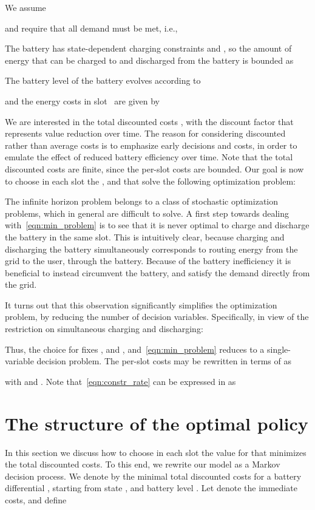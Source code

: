 \documentclass[journal]{IEEEtran}
\newcommand\1{\mathbf{1}}
\begin{document}
We assume

and require that all demand must be met, i.e.,

The battery has state-dependent charging constraints  and , so the amount of energy that can be charged to and discharged from the battery is bounded as



The battery level of the battery evolves according to

and the energy costs in slot~ are given by

We are interested in the total discounted costs , with  the discount factor that represents value reduction over time. The reason for considering discounted rather than average costs is to emphasize early decisions and costs, in order to emulate the effect of reduced battery efficiency over time. Note that the total discounted costs are finite, since the per-slot costs are bounded. Our goal is now to choose in each slot the ,  and  that solve the following optimization problem:


The infinite horizon problem belongs to a class of stochastic optimization problems, which
in general are difficult to solve. A first step towards dealing with~\eqref{eqn:min_problem} is to see that it is never optimal to charge and discharge the battery in the same slot.
This is intuitively clear, because charging and discharging the battery simultaneously corresponds to routing  energy from the grid to the user, through the battery. Because of the battery inefficiency it is beneficial to instead circumvent the battery, and satisfy the demand directly from the grid.

It turns out that this observation significantly simplifies the optimization problem, by reducing the number of decision variables.
Specifically, in view of the restriction on simultaneous charging and discharging:

Thus, the choice for  fixes ,  and , and~\eqref{eqn:min_problem} reduces to a single-variable decision problem. The per-slot costs may be rewritten in terms of  as

with  and . Note that~\eqref{eqn:constr_rate} can be expressed in  as




\section{The structure of the optimal policy}\label{sec:structure}
In this section we discuss how to choose in each slot the value for  that minimizes the total discounted costs. To this end, we rewrite our model as a Markov decision process. We denote by  the minimal total discounted costs for a battery differential , starting from state , and battery level . Let  denote the immediate costs,  and define
\end{document}
